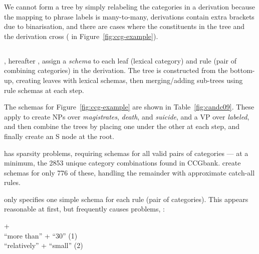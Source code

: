 We cannot form a \ptb tree by simply relabeling the categories in a \ccg
derivation because the mapping to phrase labels is many-to-many, \ccg
derivations contain extra brackets due to binarisation, and there are cases
where the constituents in the \ptb tree and the \ccg derivation cross (\myeg
in Figure~\ref{fig:ccg-example}).

\subsection{\textcite{Clark-Curran:2009}}

\textcite{Clark-Curran:2009}, hereafter \old,  assign a {\em schema} to each
leaf (lexical category) and rule (pair of combining categories) in the \ccg derivation.
The \ptb tree is constructed from the \ccg bottom-up, creating leaves with
lexical schemas, then merging/adding sub-trees using rule schemas at each step.

The schemas for Figure~\ref{fig:ccg-example} are shown in Table~\ref{fig:candc09}.
These apply to create NPs over \textit{magistrates}, \textit{death}, and
\textit{suicide}, and a VP over \textit{labeled}, and then combine the trees by
placing one under the other at each step, and finally create an S node at the
root.

\old has sparsity problems, requiring schemas for all valid pairs of
categories --- at a minimum, the 2853 unique category combinations found in
CCGbank. \textcite{Clark-Curran:2009} create schemas for only 776 of these,
handling the remainder with approximate catch-all rules.

\old only specifies one simple schema for each rule (pair of
categories).  This appears reasonable at first, but frequently causes
problems, \myeg:

\vspace{2mm}
\parbox{0.97\linewidth}{\footnotesize
{} +  \\
``more than'' + ``30'' \hfill(1)\hspace*{2mm}\\ %
``relatively'' + ``small'' \hfill(2)\hspace*{2mm}\\ %
}

